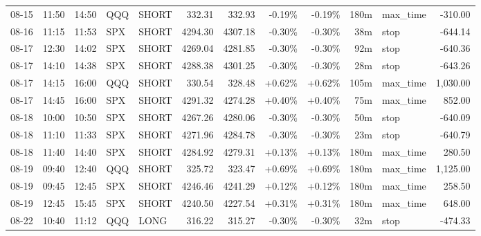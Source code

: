 \documentclass[11pt,a4paper,twoside]{article}
\begin{document}
\begin{center}
\begin{longtable}{>{\color{txtmain}}l l l l l r r r r r >{\color{txtmain}}l r}
08-15 & 11:50 & 14:50 & QQQ & SHORT & 332.31 & 332.93 & \textcolor{lossred}{-0.19\%} & \textcolor{lossred}{-0.19\%} & 180m & max\_time & \textcolor{lossred}{-310.00} \\
08-16 & 11:15 & 11:53 & SPX & SHORT & 4294.30 & 4307.18 & \textcolor{lossred}{-0.30\%} & \textcolor{lossred}{-0.30\%} & 38m & stop & \textcolor{lossred}{-644.14} \\
08-17 & 12:30 & 14:02 & SPX & SHORT & 4269.04 & 4281.85 & \textcolor{lossred}{-0.30\%} & \textcolor{lossred}{-0.30\%} & 92m & stop & \textcolor{lossred}{-640.36} \\
08-17 & 14:10 & 14:38 & SPX & SHORT & 4288.38 & 4301.25 & \textcolor{lossred}{-0.30\%} & \textcolor{lossred}{-0.30\%} & 28m & stop & \textcolor{lossred}{-643.26} \\
08-17 & 14:15 & 16:00 & QQQ & SHORT & 330.54 & 328.48 & \textcolor{wingreen}{+0.62\%} & \textcolor{wingreen}{+0.62\%} & 105m & max\_time & \textcolor{wingreen}{1,030.00} \\
08-17 & 14:45 & 16:00 & SPX & SHORT & 4291.32 & 4274.28 & \textcolor{wingreen}{+0.40\%} & \textcolor{wingreen}{+0.40\%} & 75m & max\_time & \textcolor{wingreen}{852.00} \\
08-18 & 10:00 & 10:50 & SPX & SHORT & 4267.26 & 4280.06 & \textcolor{lossred}{-0.30\%} & \textcolor{lossred}{-0.30\%} & 50m & stop & \textcolor{lossred}{-640.09} \\
08-18 & 11:10 & 11:33 & SPX & SHORT & 4271.96 & 4284.78 & \textcolor{lossred}{-0.30\%} & \textcolor{lossred}{-0.30\%} & 23m & stop & \textcolor{lossred}{-640.79} \\
08-18 & 11:40 & 14:40 & SPX & SHORT & 4284.92 & 4279.31 & \textcolor{wingreen}{+0.13\%} & \textcolor{wingreen}{+0.13\%} & 180m & max\_time & \textcolor{wingreen}{280.50} \\
08-19 & 09:40 & 12:40 & QQQ & SHORT & 325.72 & 323.47 & \textcolor{wingreen}{+0.69\%} & \textcolor{wingreen}{+0.69\%} & 180m & max\_time & \textcolor{wingreen}{1,125.00} \\
08-19 & 09:45 & 12:45 & SPX & SHORT & 4246.46 & 4241.29 & \textcolor{wingreen}{+0.12\%} & \textcolor{wingreen}{+0.12\%} & 180m & max\_time & \textcolor{wingreen}{258.50} \\
08-19 & 12:45 & 15:45 & SPX & SHORT & 4240.50 & 4227.54 & \textcolor{wingreen}{+0.31\%} & \textcolor{wingreen}{+0.31\%} & 180m & max\_time & \textcolor{wingreen}{648.00} \\
08-22 & 10:40 & 11:12 & QQQ & LONG & 316.22 & 315.27 & \textcolor{lossred}{-0.30\%} & \textcolor{lossred}{-0.30\%} & 32m & stop & \textcolor{lossred}{-474.33} \\

\end{longtable}
\end{center}
\end{document}
